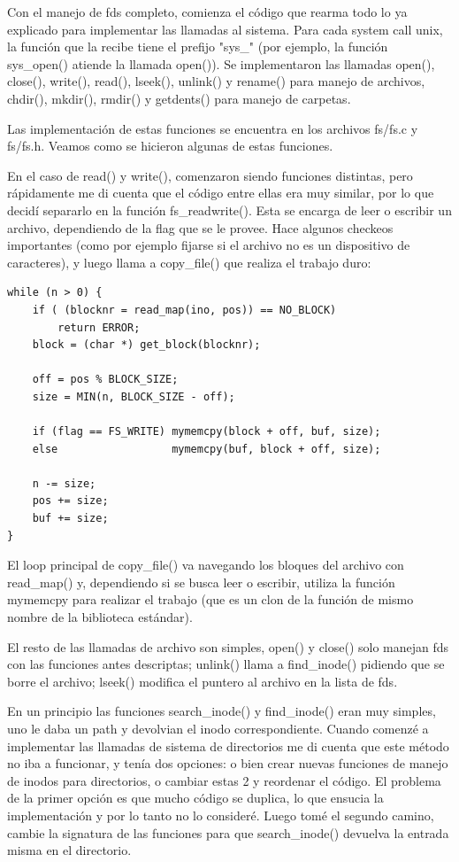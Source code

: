 Con el manejo de fds completo, comienza el código que rearma todo lo ya
explicado para implementar las llamadas al sistema. Para cada system call unix,
la función que la recibe tiene el prefijo "sys\_" (por ejemplo, la función
sys\_open() atiende la llamada open()). Se implementaron las llamadas open(),
close(), write(), read(), lseek(), unlink() y rename() para manejo de archivos,
chdir(), mkdir(), rmdir() y getdents() para manejo de carpetas.

Las implementación de estas funciones se encuentra en los archivos fs/fs.c y
fs/fs.h. Veamos como se hicieron algunas de estas funciones.

En el caso de read() y write(), comenzaron siendo funciones distintas, pero
rápidamente me di cuenta que el código entre ellas era muy similar, por lo que
decidí separarlo en la función fs\_readwrite(). Esta se encarga de leer o
escribir un archivo, dependiendo de la flag que se le provee. Hace algunos
checkeos importantes (como por ejemplo fijarse si el archivo no es un
dispositivo de caracteres), y luego llama a copy\_file() que realiza el
trabajo duro:

\begin{verbatim}
while (n > 0) {
    if ( (blocknr = read_map(ino, pos)) == NO_BLOCK)
        return ERROR;
    block = (char *) get_block(blocknr);

    off = pos % BLOCK_SIZE;
    size = MIN(n, BLOCK_SIZE - off);

    if (flag == FS_WRITE) mymemcpy(block + off, buf, size);
    else                  mymemcpy(buf, block + off, size);

    n -= size;
    pos += size;
    buf += size;
}
\end{verbatim}

El loop principal de copy\_file() va navegando los bloques del archivo con
read\_map() y, dependiendo si se busca leer o escribir, utiliza la función
mymemcpy para realizar el trabajo (que es un clon de la función de mismo nombre
de la biblioteca estándar).

El resto de las llamadas de archivo son simples, open() y close() solo manejan
fds con las funciones antes descriptas; unlink() llama a find\_inode() pidiendo
que se borre el archivo; lseek() modifica el puntero al archivo en la lista de 
fds.

En un principio las funciones search\_inode() y find\_inode() eran muy simples,
uno le daba un path y devolvian el inodo correspondiente. Cuando comenzé a
implementar las llamadas de sistema de directorios me di cuenta que
este método no iba a funcionar, y tenía dos opciones: o bien crear nuevas
funciones de manejo de inodos para directorios, o cambiar estas 2 y reordenar el
código. El problema de la primer opción es que mucho código se duplica, lo que
ensucia la implementación y por lo tanto no lo consideré. Luego tomé el segundo
camino, cambie la signatura de las funciones para que search\_inode() devuelva
la entrada misma en el directorio.

